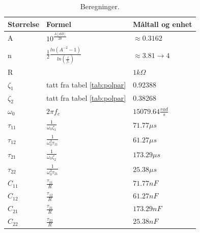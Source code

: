 \begin{table}[hbt]
    \centering
    \caption{Beregninger.}
    \begin{large}
    \begin{tabular}{|l|l|l|}
        \hline
        Størrelse   & Formel                                              & Måltall og enhet          \\ \hline
        A           & $10^{\frac{A[dB]}{20}}$                             & $\approx0.3162$           \\ \hline
        n           & $\frac{1}{2}\frac{ln(A^{-2}-1)}{ln(\frac{f}{f_c})}$ & $\approx3.81\rightarrow4$ \\ \hline
        R           &                                                     & $1k\Omega$                \\ \hline
        $\zeta_1$   & tatt fra tabel \ref{tab:polpar}                     & 0.92388                   \\ \hline
        $\zeta_2$   & tatt fra tabel \ref{tab:polpar}                     & 0.38268                   \\ \hline
        $\omega_0$  & $2\pi f_c$                                          & $15079.64\frac{rad}{s}$   \\ \hline
        $\tau_{11}$ & $\frac{1}{\omega_0 \zeta_1}$                        & $71.77\mu s$              \\ \hline
        $\tau_{12}$ & $\frac{1}{\omega_0^2 \tau_{11}}$                    & $61.27\mu s$              \\ \hline
        $\tau_{21}$ & $\frac{1}{\omega_0 \zeta_2}$                        & $173.29\mu s$             \\ \hline
        $\tau_{22}$ & $\frac{1}{\omega_0^2 \tau_{21}}$                    & $25.38\mu s$              \\ \hline
        $C_{11}$      & $\frac{\tau_{11}}{R}$                               & $71.77nF$              \\ \hline
        $C_{12}$      & $\frac{\tau_{12}}{R}$                               & $61.27nF$              \\ \hline
        $C_{21}$      & $\frac{\tau_{21}}{R}$                               & $173.29nF$             \\ \hline
        $C_{22}$      & $\frac{\tau_{22}}{R}$                               & $25.38nF$              \\ \hline
        \end{tabular}
    \end{large}
    \label{tab:calculations}
    \end{table}

